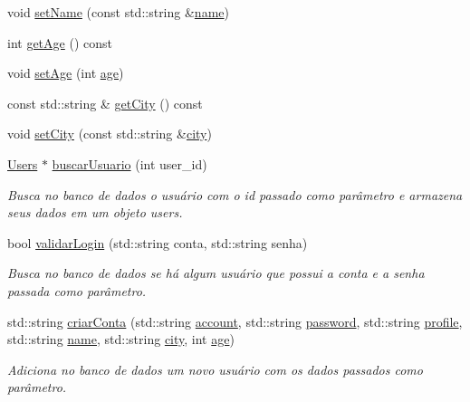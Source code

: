 \begin{DoxyCompactItemize}
void \hyperlink{class_t_a_d_1_1_users_ac0d03e3949130bf6a99dd8284ed07828}{set\+Name} (const std\+::string \&\hyperlink{class_t_a_d_1_1_users_af3d17249c461b12bbc71491da7b4cb94}{name})
\item 
int \hyperlink{class_t_a_d_1_1_users_a00ebe0f9d035097f82c37164c9dc5c6e}{get\+Age} () const
\item 
void \hyperlink{class_t_a_d_1_1_users_a0ee5c6fbfaa0682443749cacecdd0289}{set\+Age} (int \hyperlink{class_t_a_d_1_1_users_a0801b7b5b5bb7125b839bec33b86b72f}{age})
\item 
const std\+::string \& \hyperlink{class_t_a_d_1_1_users_a67bf3bdf5e4030e59f136d8b29ea7cfa}{get\+City} () const
\item 
void \hyperlink{class_t_a_d_1_1_users_a1a11d3c4f4a76b389027434f3e2f17cc}{set\+City} (const std\+::string \&\hyperlink{class_t_a_d_1_1_users_acc9188d8a53143889d39986dd4e65997}{city})
\item 
\hyperlink{class_t_a_d_1_1_users}{Users} $\ast$ \hyperlink{class_t_a_d_1_1_users_a3b681998b5ce1ed820dae5fbede28c99}{buscar\+Usuario} (int user\+\_\+id)
\begin{DoxyCompactList}\small\item\em Busca no banco de dados o usuário com o id passado como parâmetro e armazena seus dados em um objeto users. \end{DoxyCompactList}\item 
bool \hyperlink{class_t_a_d_1_1_users_a31bd3d9d888909186aec4ff540d70134}{validar\+Login} (std\+::string conta, std\+::string senha)
\begin{DoxyCompactList}\small\item\em Busca no banco de dados se há algum usuário que possui a conta e a senha passada como parâmetro. \end{DoxyCompactList}\item 
std\+::string \hyperlink{class_t_a_d_1_1_users_a0cf77d6b4cf7b8d30b7fd04615ea1155}{criar\+Conta} (std\+::string \hyperlink{class_t_a_d_1_1_users_a013ff5d23b0a55d1ff6592c249a541d1}{account}, std\+::string \hyperlink{class_t_a_d_1_1_users_a79868d049deeaf4a13005edd3c25cbc3}{password}, std\+::string \hyperlink{class_t_a_d_1_1_users_a5f4326a94e606d2e6aa6d60ecf0d5e68}{profile}, std\+::string \hyperlink{class_t_a_d_1_1_users_af3d17249c461b12bbc71491da7b4cb94}{name}, std\+::string \hyperlink{class_t_a_d_1_1_users_acc9188d8a53143889d39986dd4e65997}{city}, int \hyperlink{class_t_a_d_1_1_users_a0801b7b5b5bb7125b839bec33b86b72f}{age})
\begin{DoxyCompactList}\small\item\em Adiciona no banco de dados um novo usuário com os dados passados como parâmetro. \end{DoxyCompactList}\item 

\end{DoxyCompactItemize}

